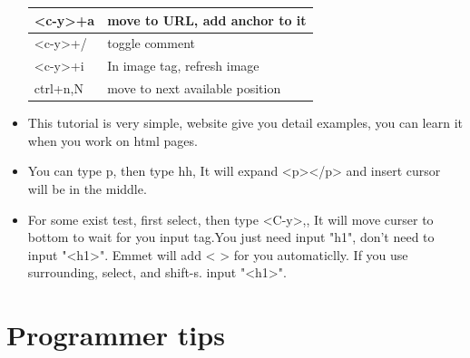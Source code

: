 \documentclass[paper=8.5in:11in, twoside, 12pt, pagesize=pdftex]{book}
\begin{document}
\begin{itemize}
\begin{tabular}{p{}|p{}}
						\hline 
						<c-y>+a & move to URL, add anchor to it \\
						
						\hline
						<c-y>+/ & toggle comment \\
						
						\hline 
						<c-y>+i & In image tag, refresh image \\
						
						\hline
						ctrl+n,N & move to next available position \\
						\hline 
					\end{tabular}
					
					\item This tutorial is very simple, website give you detail examples, you can learn it when you work on html pages. 
					
					\item You can type p, then type hh, It will expand <p></p> and insert cursor will be in the middle. 
					
					\item For some exist test, first select, then type <C-y>,, It will move curser to bottom to wait for you input tag.You just need input "h1", don't need to input "<h1>". Emmet will add < > for you automaticlly. If you use surrounding, select, and shift-s. input "<h1>". 
					
				\end{itemize}
				
				\section{Programmer tips}
\end{document}
